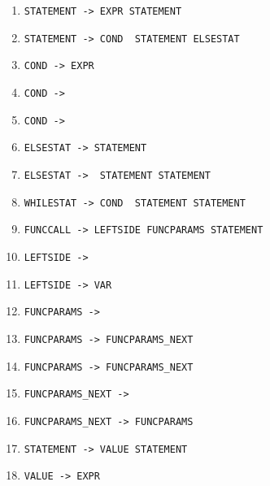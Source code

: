 \documentclass[a4paper, 12pt]{article} %
\begin{document}
{\begin{enumerate}[noitemsep]
                \item \texttt{STATEMENT ->  EXPR STATEMENT}
                \item \texttt{{STATEMENT ->  COND }
                STATEMENT  ELSESTAT}
                \item \texttt{COND -> EXPR}
                \item \texttt{COND -> }
                \item \texttt{COND -> }
                \item \texttt{ELSESTAT -> STATEMENT}
                \item \texttt{{ELSESTAT -> } STATEMENT
                STATEMENT}
                \item \texttt{{WHILESTAT ->  COND }
                STATEMENT  STATEMENT}
                \item \texttt{FUNCCALL -> LEFTSIDE  FUNCPARAMS
                 STATEMENT}
                \item \texttt{LEFTSIDE -> \blue{$\epsilon$}}
                \item \texttt{LEFTSIDE -> VAR }
                \item \texttt{FUNCPARAMS -> \blue{$\epsilon$}}
                \item \texttt{FUNCPARAMS ->  FUNCPARAMS\_NEXT}
                \item \texttt{FUNCPARAMS ->  FUNCPARAMS\_NEXT}
                \item \texttt{FUNCPARAMS\_NEXT -> \blue{$\epsilon$}}
                \item \texttt{FUNCPARAMS\_NEXT ->  FUNCPARAMS}
                \item \texttt{STATEMENT ->  VALUE STATEMENT}
                \item \texttt{VALUE -> EXPR}
            \end{enumerate}}
\end{document}
